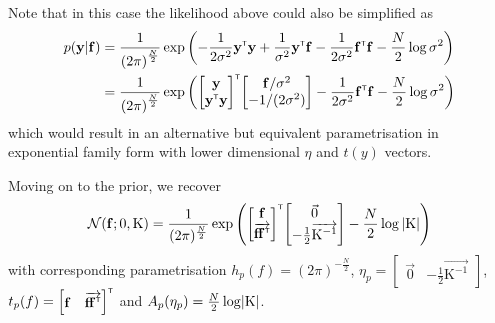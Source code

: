 \documentclass[a4paper]{article}
\theoremstyle{definition}
\begin{document}
Note that in this case the likelihood above could also be simplified as 
\begin{align}
p(\vy| \vf) &=  \frac{1}{\left( {2\pi}\right)^\frac{N}{2} } \exp{\left(-\frac{1}{2\sigma^2}\vy\transpose\vy+\frac{1}{\sigma^2}\vy\transpose\vf-\frac{1}{2\sigma^2}\vf\transpose\vf - \frac{N}{2} \log{\sigma^2}\right) } \\
&=  \frac{1}{\left( {2\pi}\right)^\frac{N}{2} } \exp{\left(\begin{bmatrix} \vy  \\ \vy\transpose\vy\end{bmatrix}\transpose\begin{bmatrix} \vf/\sigma^2 \\ -1/(2\sigma^2)\end{bmatrix} - \frac{1}{2\sigma^2} \vf\transpose\vf - \frac{N}{2} \log{\sigma^2} \right)}
\end{align}
which would result in an alternative but equivalent parametrisation in exponential family form with lower dimensional $\eta$ and $t(y)$ vectors.

Moving on to the prior, we recover
\begin{equation}
\NormDist{\vf; 0, \mathrm K} =  \frac{1}{ (2 \pi)^\frac{N}{2}}  \exp{\left(\begin{bmatrix} \vf \\ \overrightarrow{\vf  \vf \transpose}\end{bmatrix}\transpose\begin{bmatrix} \vec{0} \\ -\frac{1}{2}\overrightarrow{\mathrm K^{-1}}\end{bmatrix} - \frac{N}{2} \log{\detbar{\mathrm K}}\right)}
\end{equation}
with corresponding parametrisation $h_p(f) = (2\pi)^{-\frac{N}{2}}$, $\eta_p =  \begin{bmatrix}\vec{0} & -\frac{1}{2}\overrightarrow{\mathrm K^{-1}}\end{bmatrix}$, $t_p(f) = \begin{bmatrix} \mathbf{f} & \overrightarrow{\mathbf{f}  \mathbf{f} ^\mathrm{\textsf{\tiny T}}}\end{bmatrix}^\mathrm{\textsf{\tiny T}}$ and $A_p(\eta_p) = \frac{N}{2} \log\detbar{\mathrm K}$.
\end{document}
